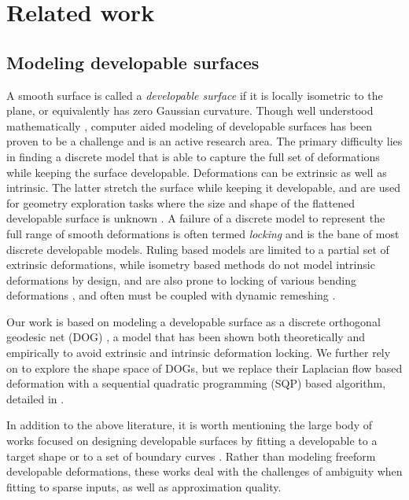 
\section{Related work}
\subsection{Modeling developable surfaces}
A smooth surface is called a \textit{developable surface} if it is locally isometric to the plane, or equivalently has zero Gaussian curvature. Though well understood mathematically \cite{do_carmo,spivak,computational_line}, computer aided modeling of developable surfaces has been proven to be a challenge and is an active research area. The primary difficulty lies in finding a discrete model that is able to capture the full set of deformations while keeping the surface developable. Deformations can be extrinsic as well as intrinsic. The latter stretch the surface while keeping it developable, and are used for geometry exploration tasks where the size and shape of the flattened developable surface is unknown \cite{conical,pottmann_new,rabi2018shape}. A failure of a discrete model to represent the full range of smooth deformations is often termed \emph{locking} \cite{solomon,locking1} and is the bane of most discrete developable models. Ruling based models \cite{conical,curved_folding_kilian,pottmann_new,stein_dev,solomon} are limited to a partial set of extrinsic deformations, while isometry based methods \cite{grin_shells,shells, goldenthal2007efficient,froh_botsch} do not model intrinsic deformations by design, and are also prone to locking of various bending deformations \cite{locking1,locking2}, and often must be coupled with dynamic remeshing \cite{narain2012adaptive,StringActuated:2017,Narain,SchreckEG2017}.

Our work is based on modeling a developable surface as a discrete orthogonal geodesic net (DOG) \cite{rabi18}, a model that has been shown both theoretically and empirically to avoid extrinsic and intrinsic deformation locking. 
We further rely on \cite{rabi2018shape} to explore the shape space of DOGs, but we replace their Laplacian flow based deformation with a sequential quadratic programming (SQP) based algorithm, detailed in . 

In addition to the above literature, it is worth mentioning the large body of works focused on designing developable surfaces by fitting a developable to a target shape \cite{pottmann_approx,pottmann_new,stein_dev} or to a set of boundary curves \cite{sheffer,Frey1,Frey2,bo2019multi}. Rather than modeling freeform developable deformations, these works deal with the challenges of ambiguity when fitting to sparse inputs, as well as approximation quality. 

